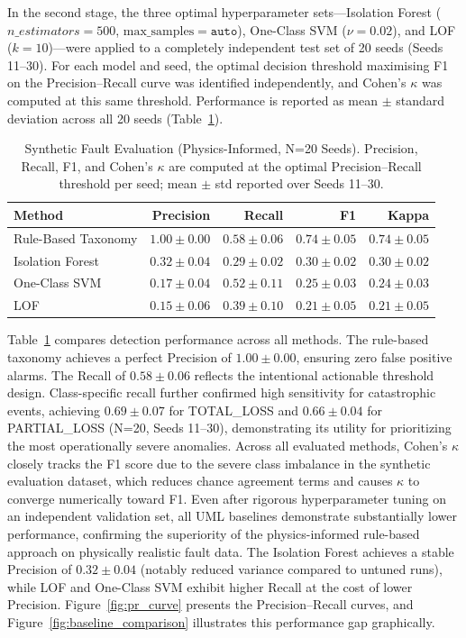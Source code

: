 \documentclass[11pt,a4paper,twoside]{article}
\begin{document}
In the second stage, the three optimal hyperparameter sets---Isolation
Forest ($n\_estimators = 500$, $\mathrm{max\_samples} = \texttt{auto}$),
One-Class SVM ($\nu = 0.02$), and LOF ($k = 10$)---were applied to a
completely independent test set of 20 seeds (Seeds 11--30). For each
model and seed, the optimal decision threshold maximising F1 on the
Precision--Recall curve was identified independently, and Cohen's
$\kappa$ was computed at this same threshold. Performance is reported
as mean $\pm$ standard deviation across all 20 seeds (Table~\ref{tab:synthetic_faults}).

\begin{table}[H]
\caption{Synthetic Fault Evaluation (Physics-Informed, N=20 Seeds). Precision, Recall, F1, and Cohen's $\kappa$ are computed at the optimal Precision--Recall threshold per seed; mean $\pm$ std reported over Seeds 11--30.}
\begin{center}
\begin{tabular}{lrrrr}
\toprule
\textbf{Method} & \textbf{Precision} & \textbf{Recall} & \textbf{F1} & \textbf{Kappa} \\
\midrule
Rule-Based Taxonomy & $1.00 \pm 0.00$ & $0.58 \pm 0.06$ & $0.74 \pm 0.05$ & $0.74 \pm 0.05$ \\
Isolation Forest    & $0.32 \pm 0.04$ & $0.29 \pm 0.02$ & $0.30 \pm 0.02$ & $0.30 \pm 0.02$ \\
One-Class SVM       & $0.17 \pm 0.04$ & $0.52 \pm 0.11$ & $0.25 \pm 0.03$ & $0.24 \pm 0.03$ \\
LOF                 & $0.15 \pm 0.06$ & $0.39 \pm 0.10$ & $0.21 \pm 0.05$ & $0.21 \pm 0.05$ \\
\bottomrule
\end{tabular}
\label{tab:synthetic_faults}
\end{center}
\end{table}

Table~\ref{tab:synthetic_faults} compares detection performance across all methods. The rule-based taxonomy achieves a perfect Precision of $1.00 \pm 0.00$, ensuring zero false positive alarms. The Recall of $0.58 \pm 0.06$ reflects the intentional actionable threshold design. Class-specific recall further confirmed high sensitivity for catastrophic events, achieving $0.69 \pm 0.07$ for TOTAL\_LOSS and $0.66 \pm 0.04$ for PARTIAL\_LOSS (N=20, Seeds 11--30), demonstrating its utility for prioritizing the most operationally severe anomalies. Across all evaluated methods, Cohen's $\kappa$ closely tracks the F1 score due to the severe class imbalance in the synthetic evaluation dataset, which reduces chance agreement terms and causes $\kappa$ to converge numerically toward F1. Even after rigorous hyperparameter tuning on an independent validation set, all UML baselines demonstrate substantially lower performance, confirming the superiority of the physics-informed rule-based approach on physically realistic fault data. The Isolation Forest achieves a stable Precision of $0.32 \pm 0.04$ (notably reduced variance compared to untuned runs), while LOF and One-Class SVM exhibit higher Recall at the cost of lower Precision. Figure~\ref{fig:pr_curve} presents the Precision--Recall curves, and Figure~\ref{fig:baseline_comparison} illustrates this performance gap graphically.
\end{document}

